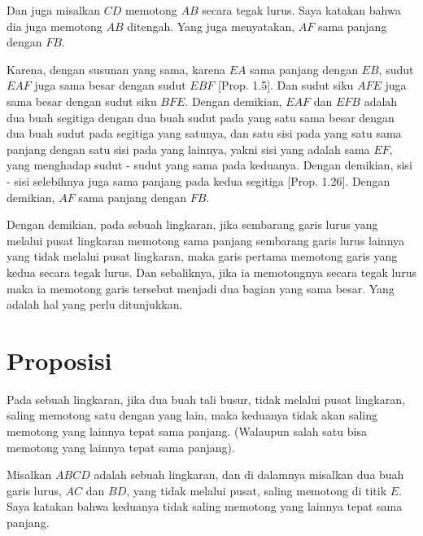 \documentclass[a4paper]{book}
\begin{document}
Dan juga misalkan $CD$ memotong $AB$ secara tegak lurus. Saya katakan bahwa
dia juga memotong $AB$ ditengah. Yang juga menyatakan, $AF$ sama panjang dengan
$FB$.

Karena, dengan susunan yang sama, karena $EA$ sama panjang dengan $EB$, sudut
$EAF$ juga sama besar dengan sudut $EBF$ [Prop. 1.5]. Dan sudut siku $AFE$ juga
sama besar dengan sudut siku $BFE$. Dengan demikian, $EAF$ dan $EFB$ adalah dua
buah segitiga dengan dua buah sudut pada yang satu sama besar dengan dua buah
sudut pada segitiga yang satunya, dan satu sisi pada yang satu sama panjang 
dengan satu sisi pada yang lainnya, yakni sisi yang adalah sama 
$EF$, yang menghadap sudut - sudut yang sama pada keduanya. Dengan demikian, 
sisi - sisi selebihnya juga sama panjang pada kedua segitiga [Prop. 1.26]. 
Dengan demikian, $AF$ sama panjang dengan $FB$.

Dengan demikian, pada sebuah lingkaran, jika sembarang garis lurus yang 
melalui pusat lingkaran memotong sama panjang sembarang garis lurus 
lainnya yang 
tidak melalui pusat lingkaran, maka garis pertama memotong garis yang kedua 
secara tegak lurus.  Dan sebaliknya, jika ia memotongnya secara tegak lurus 
maka ia memotong garis tersebut menjadi dua bagian yang sama besar. Yang adalah
hal yang perlu ditunjukkan.

\section*{\centering Proposisi \thesection}
Pada sebuah lingkaran, jika dua buah tali busur, tidak melalui pusat lingkaran,
saling memotong satu dengan yang lain, maka keduanya tidak akan saling memotong 
yang lainnya tepat sama panjang. (Walaupun salah satu bisa memotong yang 
lainnya tepat sama panjang).

\begin{center}
\end{center}

Misalkan $ABCD$ adalah sebuah lingkaran, dan di dalamnya misalkan dua buah 
garis lurus, $AC$ dan $BD$, yang tidak melalui pusat, saling memotong di titik
$E$. Saya katakan bahwa keduanya tidak saling memotong yang lainnya tepat
sama panjang.
\end{document}

